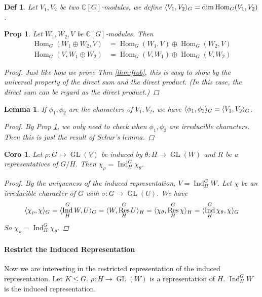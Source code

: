 \documentclass[a4paper]{article}
\DeclarePairedDelimiter{\inpd}{\langle}{\rangle} %
\newcommand*{\Cb}{\mathbb{C}}
\DeclareMathOperator{\Res}{Res}
\DeclareMathOperator{\Ind}{Ind}
\newcommand*\GL[1]{\operatorname{GL}\mathopen{}\left({#1}\right)\mathclose{}}
\DeclareMathOperator{\Hom}{Hom}
\theoremstyle{mystyle}
\newtheorem{lemma}{Lemma}
\newtheorem{definition}{Def}
\newtheorem{prop}{Prop}
\newtheorem{coro}{Coro}
\begin{document}
\begin{definition}
  Let $V_1, V_2$ be two $\Cb[G]$-modules, we define
  $\inpd{V_1, V_2}_G = \dim \Hom_G(V_1, V_2)$.
\end{definition}

\begin{prop}
  \label{prop:dimop}
  Let $W_1, W_2, V$ be $\Cb[G]$-modules. Then
  \begin{align*}
    \Hom_G(W_1 \oplus W_2, V) &= \Hom_G(W_1, V) \oplus \Hom_G(W_2, V) \\
    \Hom_G(V, W_1 \oplus W_2) &= \Hom_G(V, W_1) \oplus \Hom_G(V, W_2)
  \end{align*}
  \begin{proof}
    Just like how we prove Thm \ref{thm:frob},
    this is easy to show by the universal property of the direct sum
    and the direct product.
    (In this case, the direct sum can be regard as the direct product.)
  \end{proof}
\end{prop}

\begin{lemma}
  \label{lemma:inpd}
  If $\phi_1, \phi_2$ are the characters of $V_1, V_2$, we have
  $\inpd{\phi_1, \phi_2}_G = \inpd{V_1, V_2}_G$.
  \begin{proof}
    By Prop \ref{prop:dimop}, we only need to check when $\phi_1, \phi_2$
    are irreducible characters.
    Then this is just the result of Schur's lemma.
  \end{proof}
\end{lemma}

\begin{coro}
  \label{coro:chi}
  Let $\rho: G\to \GL{V}$ be induced by $\theta:H\to \GL{W}$ and
  $R$ be a representatives of $G/H$. Then $\chi_\rho = \Ind^G_H \chi_\theta$.
  \begin{proof}
    By the uniqueness of the induced representation, $V = \Ind^G_H W$.
    Let $\chi$ be an irreducible character of $G$ with
    $\sigma: G\to \GL{U}$. We have
    \[
      \inpd{\chi_\rho, \chi}_G = \inpd{\Ind^G_H W, U}_G
      = \inpd{W, \Res^G_H U}_H = \inpd{\chi_\theta, \Res^G_H \chi}_H
      = \inpd{\Ind^G_H \chi_\theta, \chi}_G
    \]
    So $\chi_\rho = \Ind^G_H \chi_\theta$.
  \end{proof}
\end{coro}

\paragraph{Restrict the Induced Representation}
Now we are interesting in the restricted representation of the induced
representation. Let $K \le G$. $\rho: H\to \GL{W}$ is a representation
of $H$. $\Ind^G_H W$ is the induced representation.
\end{document}
